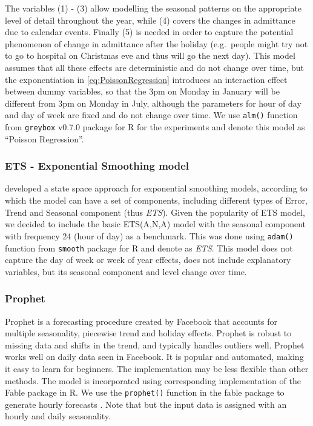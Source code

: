 \documentclass[]{elsarticle} %
\begin{document}
The variables (1) - (3) allow modelling the seasonal patterns on the appropriate level of detail throughout the year, while (4) covers the changes in admittance due to calendar events. Finally (5) is needed in order to capture the potential phenomenon of change in admittance after the holiday (e.g.~people might try not to go to hospital on Christmas eve and thus will go the next day). This model assumes that all these effects are deterministic and do not change over time, but the exponentiation in \eqref{eq:PoissonRegression} introduces an interaction effect between dummy variables, so that the 3pm on Monday in January will be different from 3pm on Monday in July, although the parameters for hour of day and day of week are fixed and do not change over time. We use \texttt{alm()} function from \texttt{greybox} v0.7.0 package \citep{Svetunkov2021Greybox} for R \citep{RTeam2021} for the experiments and denote this model as ``Poisson Regression''.

\hypertarget{ets---exponential-smoothing-model}{%
\subsubsection{ETS - Exponential Smoothing model}\label{ets---exponential-smoothing-model}}

\citet{Hyndman2008b} developed a state space approach for exponential smoothing models, according to which the model can have a set of components, including different types of Error, Trend and Seasonal component (thus \emph{ETS}). Given the popularity of ETS model, we decided to include the basic ETS(A,N,A) model with the seasonal component with frequency 24 (hour of day) as a benchmark. This was done using \texttt{adam()} function from \texttt{smooth} package \citep{Svetunkov2021Smooth} for R and denote as \emph{ETS}. This model does not capture the day of week or week of year effects, does not include explanatory variables, but its seasonal component and level change over time.

\hypertarget{prophet}{%
\subsubsection{Prophet}\label{prophet}}

Prophet is a forecasting procedure created by Facebook \citep{taylor2018forecasting} that accounts for multiple seasonality, piecewise trend and holiday effects. Prophet is robust to missing data and shifts in the trend, and typically handles outliers well. Prophet works well on daily data seen in Facebook. It is popular and automated, making it easy to learn for beginners. The implementation may be less flexible than other methods.
The model is incorporated using corresponding implementation of the Fable package in R. We use the \texttt{prophet()} function in the fable package to generate hourly forecasts \citep{fable2020}. Note that but the input data is assigned with an hourly and daily seasonality.
\end{document}
